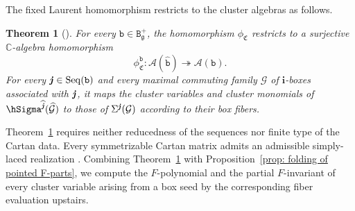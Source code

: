 \documentclass[12pt, leqno]{amsart}
\numberwithin{equation}{section}
\theoremstyle{plain}
\newtheorem{theorem}[lemma]{Theorem}
\theoremstyle{definition}
\newcommand{\g}{\mathfrak{g}}
\newcommand{\C}{\mathbb{C}}
\newcommand{\jj}{ \textbf{\textit{j}}}
\newcommand{\hjj}{{\widehat{\jj}}}
\newcommand{\frakC}{\mathfrak{C}}
\newcommand{\bfi}{\mathbf{i}}
\newcommand{\calA}{\mathcal{A}}
\newcommand{\calG}{\mathcal{G}}
\newcommand{\hcalG}{{\widehat{\calG}}}
\newcommand{\ttB}{\mathtt{B}}
\newcommand{\ttb}{\mathtt{b}}
\newcommand{\httb}{\widehat{\ttb}}
\newcommand{\Seq}{\mathrm{Seq}}
\begin{document}
The fixed Laurent homomorphism restricts to the cluster algebras as
follows.

\begin{theorem}[{\cite[Theorems~6.2 and~6.4]{JO26}}]
\label{thm: global folding for positive braids}
For every \(\ttb\in\ttB_\g^+\), the homomorphism
\(\phi_{\frakC}\) restricts to a surjective \(\C\)-algebra
homomorphism
\[
\phi_{\frakC}^{\ttb}:
\calA(\httb)\twoheadrightarrow\calA(\ttb).
\]
For every \(\jj\in\Seq(\ttb)\) and every maximal commuting family
\(\calG\) of \(\bfi\)-boxes associated with \(\jj\), it maps the
cluster variables and cluster monomials of
\(\hSigma^\hjj(\hcalG)\) to those of
\(\Sigma^\jj(\calG)\) according to their box fibers.
\end{theorem}

Theorem~\ref{thm: global folding for positive braids} requires
neither reducedness of the sequences nor finite type of the Cartan
data.  Every symmetrizable Cartan matrix admits an admissible
simply-laced realization \cite[Remark~1.3]{JO26}. Combining
Theorem~\ref{thm: global folding for positive braids}
with Proposition~\ref{prop: folding of pointed F-parts}, we compute the
\(F\)-polynomial and the partial \(F\)-invariant of every cluster variable
arising from a box seed by the corresponding fiber
evaluation upstairs. 
\end{document}
